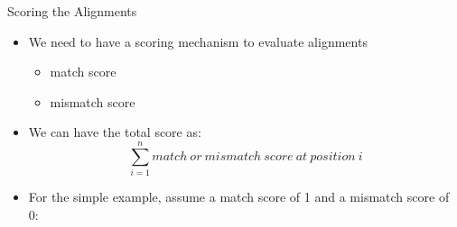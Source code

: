 \documentclass{bredelebeamer}
\begin{document}
\begin{frame}{Scoring the Alignments}
    \begin{itemize}
    \item We need to have a scoring mechanism to evaluate alignments
    \begin{itemize}
        \item match score
        \item mismatch score
        \linebreak
    \end{itemize}
    \linebreak
    \item We can have the total score as:\linebreak
    \begin{equation*}
    \sum_{i=1}^n match\: or\: mismatch\: score\: at\: position\: i
    \end{equation*}
    
    \linebreak
    \item For the simple example, assume a match score of 1 and a mismatch score of 0:
    \linebreak
    \linebreak
    \end{itemize}
\end{frame}
\end{document}
